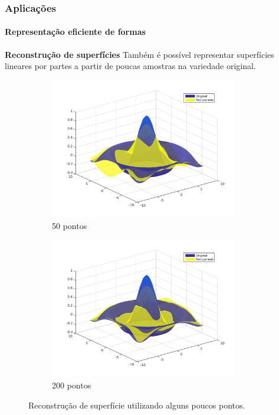 \begin{frame}
\frametitle{{\bf \color{blue} Aplicações}}
\framesubtitle{\color{blue} Representação eficiente de formas}
	\begin{block}{\bf Reconstrução de superfícies}
		Também é possível representar superfícies lineares por partes a partir de poucas amostras na variedade original.
	\end{block}
	\begin{figure}
		\centering
		\begin{subfigure}[b]{0.49\textwidth}
			\centering
			\includegraphics[width=0.9\textwidth]{imagens/rep3_50.jpg}
			\caption{50 pontos}
			\label{fig:surf100}
		\end{subfigure}
		\hfill
		\begin{subfigure}[b]{0.49\textwidth}
			\centering
			\includegraphics[width=0.9\textwidth]{imagens/rep3_200.jpg}
			\caption{200 pontos}
			\label{fig:surf300}
		\end{subfigure}
		\caption{Reconstrução de superfície utilizando alguns poucos pontos.}
	\end{figure}
	
\end{frame}

